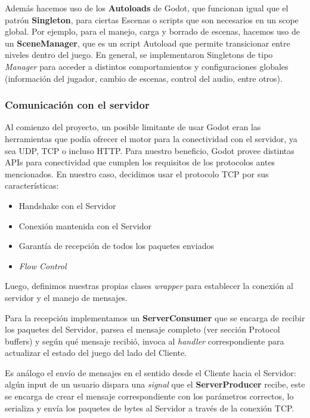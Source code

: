 Además hacemos uso de los \textbf{Autoloads} de Godot, que funcionan igual que el patrón \textbf{Singleton}, 
para ciertas Escenas o scripts que son necesarios en un scope global. Por ejemplo, para el manejo, carga 
y borrado de escenas, hacemos uso de un \textbf{SceneManager}, que es un script Autoload que permite 
transicionar entre niveles dentro del juego. En general, se implementaron Singletons de tipo \textit{Manager}
para acceder a distintos comportamientos y configuraciones globales (información del jugador, cambio de 
escenas, control del audio, entre otros).

\subsubsection{Comunicación con el servidor}

\noindent Al comienzo del proyecto, un posible limitante de usar Godot eran las herramientas que podía ofrecer 
el motor para la conectividad con el servidor, ya sea UDP, TCP o incluso HTTP. 
Para nuestro beneficio, Godot provee distintas APIs para conectividad que cumplen los requisitos
de los protocolos antes mencionados. En nuestro caso, decidimos usar el protocolo TCP por sus características:
\begin{itemize}
    \item Handshake con el Servidor
    \item Conexión mantenida con el Servidor
    \item Garantía de recepción de todos los paquetes enviados
    \item \textit{Flow Control}
\end{itemize}

Luego, definimos nuestras propias clases \textit{wrapper} para establecer la conexión al servidor y el 
manejo de mensajes. 

Para la recepción implementamos un \textbf{ServerConsumer} que se encarga de recibir los paquetes 
del Servidor, parsea el mensaje completo (ver sección Protocol buffers) y según qué mensaje recibió, 
invoca al \textit{handler} correspondiente para actualizar el estado del juego del lado del Cliente.

Es análogo el envío de mensajes en el sentido desde el Cliente hacia el Servidor: algún input de un 
usuario dispara una \textit{signal} que el \textbf{ServerProducer} recibe, este se encarga de crear 
el mensaje correspondiente con los parámetros correctos, lo serializa y envía los paquetes de bytes 
al Servidor a través de la conexión TCP.

